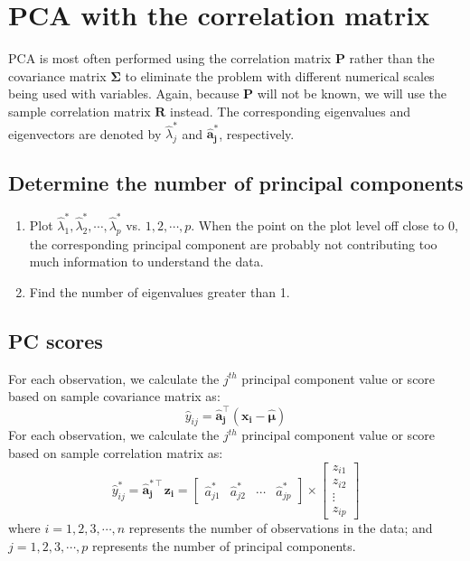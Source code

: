 \documentclass{article}
\begin{document}
\section{PCA with the correlation matrix}
PCA is most often performed using the correlation matrix $\mathbf{P}$ rather than the covariance matrix $\mathbf{\Sigma}$ to eliminate the problem with different numerical scales being used with variables. Again, because $\mathbf{P}$ will not be known, we will use the sample correlation matrix $\mathbf{R}$ instead. The corresponding eigenvalues and eigenvectors are denoted by $\hat{\lambda}_j^*$ and $\mathbf{\hat{a}_j^*}$, respectively.

\subsection{Determine the number of principal components}
\begin{enumerate}
    \item Plot $\hat{\lambda}_1^*, \hat{\lambda}_2^*, \cdots, \hat{\lambda}_p^*$ vs. $1,2,\cdots,p$. When the point on the plot level off close to $0$, the corresponding principal component are probably not contributing too much information to understand the data.
    \item Find the number of eigenvalues greater than 1.
\end{enumerate}

\subsection{PC scores}
For each observation, we calculate the $j^{th}$ principal component value or score based on sample covariance matrix as: 
\[\hat{y}_{ij} = \mathbf{\hat{a}_j^\intercal}(\mathbf{x_i}-\mathbf{\hat{\mu}})\]
For each observation, we calculate the $j^{th}$ principal component value or score based on sample correlation matrix as:  
\[\hat{y}_{ij}^* = \mathbf{\hat{a}^{*\intercal}_j}\mathbf{z_i}=\begin{bmatrix}\hat{a}_{j1}^* & \hat{a}_{j2}^* & \cdots & \hat{a}_{jp}^* \end{bmatrix}\times\begin{bmatrix}z_{i1} \\ z_{i2} \\ \vdots \\ z_{ip} \end{bmatrix}\]
where $i=1,2,3,\cdots,n$ represents the number of observations in the data; and $j=1,2,3,\cdots,p$ represents the number of principal components.
\end{document}
